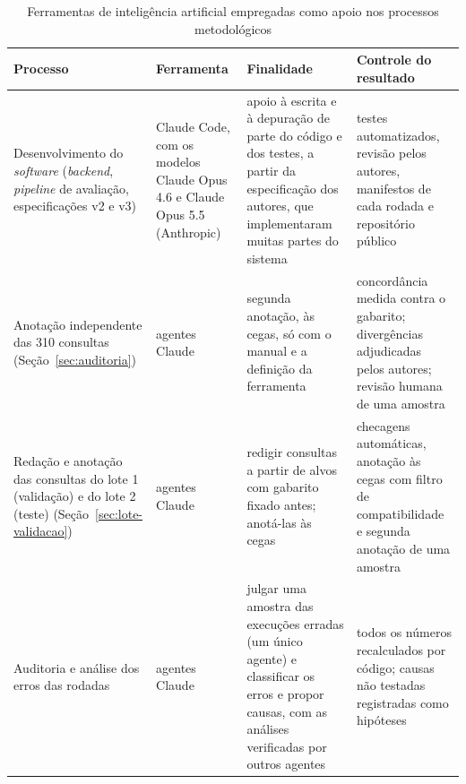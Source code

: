 \begin{table}[htbp!]
\centering
\caption{Ferramentas de inteligência artificial empregadas como apoio nos processos metodológicos}
\label{tab:uso-ia}
\small
\begin{tabular}{|>{\raggedright\arraybackslash}p{3.4cm}|>{\raggedright\arraybackslash}p{2.7cm}|>{\raggedright\arraybackslash}p{4.0cm}|>{\raggedright\arraybackslash}p{4.0cm}|}
\hline
\textbf{Processo} & \textbf{Ferramenta} & \textbf{Finalidade} & \textbf{Controle do resultado} \\
\hline
Desenvolvimento do \textit{software} (\textit{backend}, \textit{pipeline} de avaliação, especificações v2 e v3) & Claude Code, com os modelos Claude Opus 4.6 e Claude Opus 5.5 (Anthropic) & apoio à escrita e à depuração de parte do código e dos testes, a partir da especificação dos autores, que implementaram muitas partes do sistema & testes automatizados, revisão pelos autores, manifestos de cada rodada e repositório público \\
\hline
Anotação independente das 310 consultas (Seção~\ref{sec:auditoria}) & agentes Claude & segunda anotação, às cegas, só com o manual e a definição da ferramenta & concordância medida contra o gabarito; divergências adjudicadas pelos autores; revisão humana de uma amostra \\
\hline
Redação e anotação das consultas do lote 1 (validação) e do lote 2 (teste) (Seção~\ref{sec:lote-validacao}) & agentes Claude & redigir consultas a partir de alvos com gabarito fixado antes; anotá-las às cegas & checagens automáticas, anotação às cegas com filtro de compatibilidade e segunda anotação de uma amostra \\
\hline
Auditoria e análise dos erros das rodadas & agentes Claude & julgar uma amostra das execuções erradas (um único agente) e classificar os erros e propor causas, com as análises verificadas por outros agentes & todos os números recalculados por código; causas não testadas registradas como hipóteses \\
\hline
\end{tabular}
\end{table}
